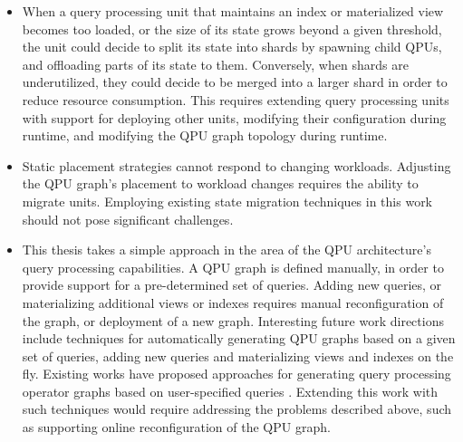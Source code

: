 \begin{itemize}
  \item When a query processing unit that maintains an index or materialized view becomes too loaded,
  or the size of its state grows beyond a given threshold,
  the unit could decide to split its state into shards by spawning child QPUs,
  and offloading parts of its state to them.
  Conversely, when shards are underutilized, they could decide to be merged into a larger shard in order
  to reduce resource consumption.
  This requires extending query processing units with support for deploying other units,
  modifying their configuration during runtime, and modifying the QPU graph topology during runtime.

  \item Static placement strategies cannot respond to changing workloads.
  Adjusting the QPU graph's placement to workload changes requires the ability to migrate units.
  Employing existing state migration techniques in this work should not pose significant challenges.

  \item This thesis takes a simple approach in the area of the QPU architecture's query processing capabilities.
  A QPU graph is defined manually, in order to provide support for a pre-determined set of queries.
  Adding new queries, or materializing additional views or indexes requires manual reconfiguration of the graph,
  or deployment of a new graph.
  Interesting future work directions include techniques for automatically generating QPU graphs based on a
  given set of queries,
  adding new queries and materializing views and indexes on the fly.
  Existing works have proposed approaches for generating query processing operator graphs based on user-specified queries
  \cite{gjengset:noria, kate:pequod}.
  Extending this work with such techniques would require addressing the problems described above,
  such as supporting online reconfiguration of the QPU graph.

\end{itemize}


